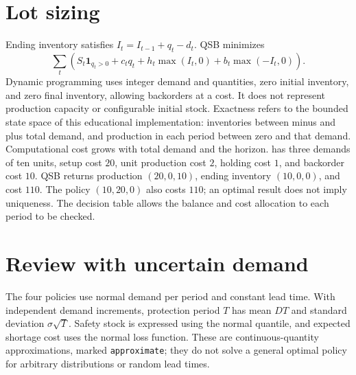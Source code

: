 \section{Lot sizing}
Ending inventory satisfies \(I_t=I_{t-1}+q_t-d_t\). QSB minimizes
\[
 \sum_t\left(S_t\mathbf{1}_{q_t>0}+c_tq_t+
 h_t\max(I_t,0)+b_t\max(-I_t,0)\right).
\]
Dynamic programming uses integer demand and quantities, zero initial inventory,
and zero final inventory, allowing backorders at a cost. It does not represent
production capacity or configurable initial stock. Exactness refers to the
bounded state space of this educational implementation: inventories between
minus and plus total demand, and production in each period between zero and
that demand. Computational cost grows with total demand and the horizon.
 has three demands of ten units, setup cost \(20\),
unit production cost \(2\), holding cost \(1\), and backorder cost \(10\).
QSB returns production \((20,0,10)\), ending inventory \((10,0,0)\), and
cost \(110\). The policy \((10,20,0)\) also costs \(110\); an optimal
result does not imply uniqueness. The decision table allows the balance and
cost allocation to each period to be checked.

\section{Review with uncertain demand}
The four policies use normal demand per period and constant lead time. With
independent demand increments, protection period \(T\) has mean \(DT\)
and standard deviation \(\sigma\sqrt T\). Safety stock is expressed using
the normal quantile, and expected shortage cost uses the normal loss function.
These are continuous-quantity approximations, marked \texttt{approximate};
they do not solve a general optimal policy for arbitrary distributions or
random lead times.

